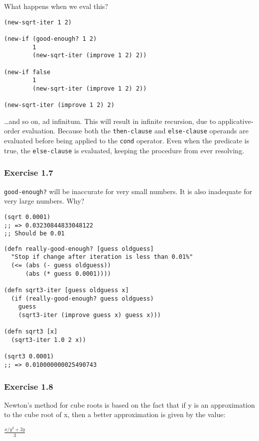 \documentclass[11pt]{article}
\begin{document}
What happens when we eval this?
\begin{verbatim}
(new-sqrt-iter 1 2)

(new-if (good-enough? 1 2)
        1
        (new-sqrt-iter (improve 1 2) 2))

(new-if false
        1
        (new-sqrt-iter (improve 1 2) 2))

(new-sqrt-iter (improve 1 2) 2)
\end{verbatim}

\ldots{}and so on, ad infinitum. This will result in infinite recursion, due to applicative-order evaluation. Because both the \texttt{then-clause} and \texttt{else-clause} operands are evaluated before being applied to the \texttt{cond} operator. Even when the predicate is true, the \texttt{else-clause} is evaluated, keeping the procedure from ever resolving.

\subsubsection{Exercise 1.7}
\label{sec-1-1-4}
\texttt{good-enough?} will be inaccurate for very small numbers. It is also inadequate for very large numbers. Why?

\begin{verbatim}
(sqrt 0.0001)
;; => 0.03230844833048122
;; Should be 0.01
\end{verbatim}

\begin{verbatim}
(defn really-good-enough? [guess oldguess]
  "Stop if change after iteration is less than 0.01%"
  (<= (abs (- guess oldguess))
      (abs (* guess 0.0001))))

(defn sqrt3-iter [guess oldguess x]
  (if (really-good-enough? guess oldguess)
    guess
    (sqrt3-iter (improve guess x) guess x)))

(defn sqrt3 [x]
  (sqrt3-iter 1.0 2 x))

(sqrt3 0.0001)
;; => 0.010000000025490743
\end{verbatim}

\subsubsection{Exercise 1.8}
\label{sec-1-1-5}
Newton's method for cube roots is based on the fact that if y is an approximation to the cube root of x, then a better approximation is given by the value:

$\frac{x/y^2 + 2y}{3}$
\end{document}
